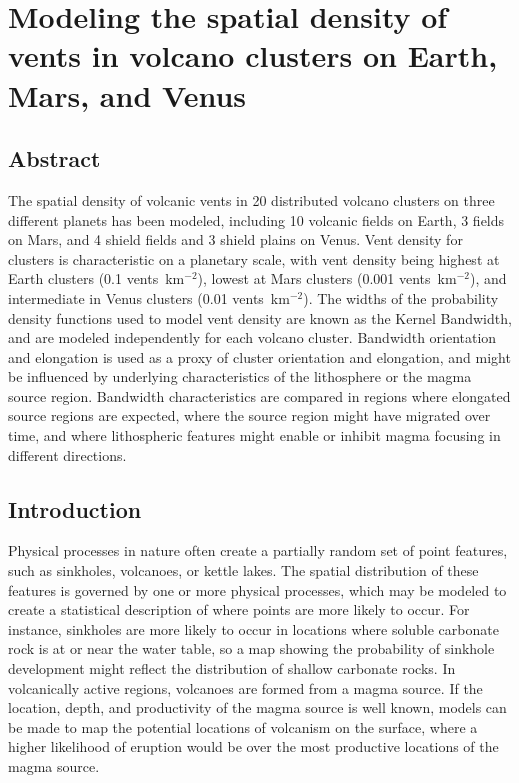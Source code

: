 \chapter[Modeling the spatial density of vents in volcano clusters on Earth, Mars, and Venus]{Modeling the spatial density of vents in volcano clusters on Earth, Mars, and Venus}\label{ch_kde}

\renewcommand*{\FigPath}{figures/chapter-spatial_density}

\section{Abstract}
The spatial density of volcanic vents in 20 distributed volcano clusters on three different planets has been modeled, including 10 volcanic fields on Earth, 3 fields on Mars, and 4 shield fields and 3 shield plains on Venus. Vent density for clusters is characteristic on a planetary scale, with vent density being highest at Earth clusters (0.1 vents~km$^{-2}$), lowest at Mars clusters (0.001 vents~km$^{-2}$), and intermediate in Venus clusters (0.01 vents~km$^{-2}$). The widths of the probability density functions used to model vent density are known as the Kernel Bandwidth, and are modeled independently for each volcano cluster. Bandwidth orientation and elongation is used as a proxy of cluster orientation and elongation, and might be influenced by underlying characteristics of the lithosphere or the magma source region. Bandwidth characteristics are compared in regions where elongated source regions are expected, where the source region might have migrated over time, and where lithospheric features might enable or inhibit magma focusing in different directions.

\section{Introduction}

Physical processes in nature often create a partially random set of point features, such as sinkholes, volcanoes, or kettle lakes. The spatial distribution of these features is governed by one or more physical processes, which may be modeled to create a statistical description of where points are more likely to occur. For instance, sinkholes are more likely to occur in locations where soluble carbonate rock is at or near the water table, so a map showing the probability of sinkhole development might reflect the distribution of shallow carbonate rocks. In volcanically active regions, volcanoes are formed from a magma source. If the location, depth, and productivity of the magma source is well known, models can be made to map the potential locations of volcanism on the surface, where a higher likelihood of eruption would be over the most productive locations of the magma source. 

